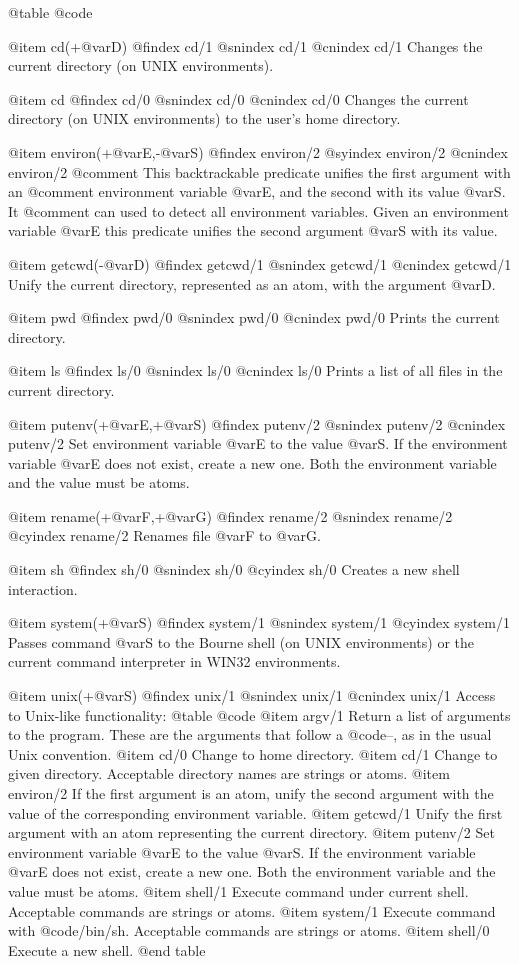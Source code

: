 {{{{{{@table @code

@item cd(+@var{D})
@findex cd/1
@snindex cd/1
@cnindex cd/1
Changes the current directory (on UNIX environments).

@item cd
@findex cd/0
@snindex cd/0
@cnindex cd/0
Changes the current directory (on UNIX environments) to the user's home directory.

@item environ(+@var{E},-@var{S})
@findex environ/2
@syindex environ/2
@cnindex environ/2
@comment This backtrackable predicate unifies the first argument with an
@comment environment variable @var{E}, and the second with its value @var{S}. It
@comment can used to detect all environment variables.
    Given an environment variable @var{E} this predicate unifies the second argument @var{S} with its value.

@item getcwd(-@var{D})
@findex getcwd/1
@snindex getcwd/1
@cnindex getcwd/1
Unify the current directory, represented as an atom, with the argument
@var{D}.

@item pwd
@findex pwd/0
@snindex pwd/0
@cnindex pwd/0
Prints the current directory.

@item ls
@findex ls/0
@snindex ls/0
@cnindex ls/0
Prints a list of all files in the current directory.

@item putenv(+@var{E},+@var{S})
@findex putenv/2
@snindex putenv/2
@cnindex putenv/2
Set environment variable @var{E} to the value @var{S}. If the
environment variable @var{E} does not exist, create a new one. Both the
environment variable and the value must be atoms.

@item rename(+@var{F},+@var{G})
@findex rename/2
@snindex rename/2
@cyindex rename/2
Renames file @var{F} to @var{G}.

@item sh
@findex sh/0
@snindex sh/0
@cyindex sh/0
Creates a new shell interaction.

@item system(+@var{S})
@findex system/1
@snindex system/1
@cyindex system/1
Passes command @var{S} to the Bourne shell (on UNIX environments) or the
current command interpreter in WIN32 environments.

@item unix(+@var{S})
@findex unix/1
@snindex unix/1
@cnindex unix/1
Access to Unix-like functionality:
@table @code
@item argv/1
Return a list of arguments to the program. These are the arguments that
follow a @code{--}, as in the usual Unix convention.
@item cd/0
Change to home directory.
@item cd/1
Change to given directory. Acceptable directory names are strings or
atoms.
@item environ/2
If the first argument is an atom, unify the second argument with the
value of the corresponding environment variable.
@item getcwd/1
Unify the first argument with an atom representing the current directory.
@item putenv/2
Set environment variable @var{E} to the value @var{S}. If the
environment variable @var{E} does not exist, create a new one. Both the
environment variable and the value must be atoms.
@item shell/1
Execute command under current shell. Acceptable commands are strings or
atoms.
@item system/1
Execute command with @code{/bin/sh}. Acceptable commands are strings or
atoms.
@item shell/0
Execute a new shell.
@end table

}}}}}}

